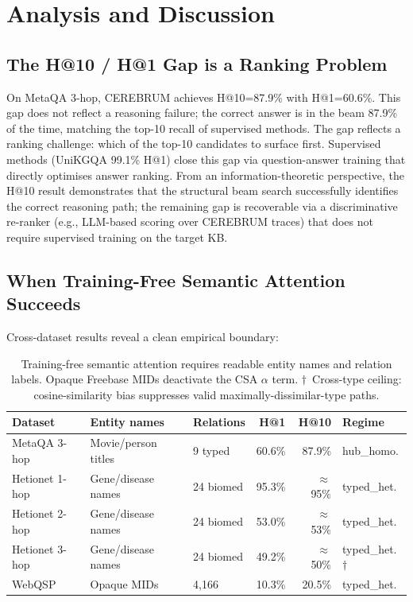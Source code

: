 \documentclass[11pt,a4paper]{article}
\begin{document}
\section{Analysis and Discussion}
\label{sec:discussion}

\subsection{The H@10 / H@1 Gap is a Ranking Problem}

On MetaQA 3-hop, CEREBRUM achieves H@10=87.9\% with H@1=60.6\%. This gap does
not reflect a reasoning failure; the correct answer is in the beam 87.9\% of
the time, matching the top-10 recall of supervised methods. The gap reflects a
ranking challenge: which of the top-10 candidates to surface first. Supervised
methods (UniKGQA 99.1\% H@1) close this gap via question-answer training that
directly optimises answer ranking. From an information-theoretic perspective, the
H@10 result demonstrates that the structural beam search successfully identifies
the correct reasoning path; the remaining gap is recoverable via a discriminative
re-ranker (e.g., LLM-based scoring over CEREBRUM traces) that does not require
supervised training on the target KB.

\subsection{When Training-Free Semantic Attention Succeeds}

Cross-dataset results reveal a clean empirical boundary:

\begin{table}[h]
\centering
\begin{tabular}{lllrrl}
\toprule
\textbf{Dataset} & \textbf{Entity names} & \textbf{Relations} & \textbf{H@1} & \textbf{H@10} & \textbf{Regime} \\
\midrule
MetaQA 3-hop     & Movie/person titles & 9 typed   & 60.6\% & 87.9\% & hub\_homo. \\
Hetionet 1-hop   & Gene/disease names  & 24 biomed & 95.3\% & $\approx$95\% & typed\_het. \\
Hetionet 2-hop   & Gene/disease names  & 24 biomed & 53.0\% & $\approx$53\% & typed\_het. \\
Hetionet 3-hop   & Gene/disease names  & 24 biomed & 49.2\% & $\approx$50\% & typed\_het.$\dagger$ \\
WebQSP           & Opaque MIDs         & 4,166     & 10.3\% & 20.5\% & typed\_het. \\
\bottomrule
\end{tabular}
\caption{Training-free semantic attention requires readable entity names and
relation labels. Opaque Freebase MIDs deactivate the CSA $\alpha$ term.
$\dagger$~Cross-type ceiling: cosine-similarity bias suppresses valid
maximally-dissimilar-type paths.}
\label{tab:boundary}
\end{table}
\end{document}
